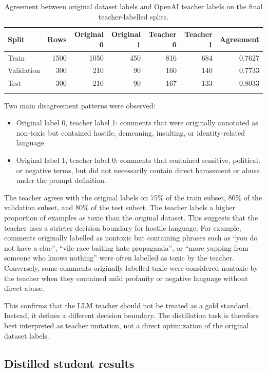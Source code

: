 \documentclass[pdflatex,sn-mathphys-num]{sn-jnl}
\begin{document}
\begin{table}[ht]
\caption{Agreement between original dataset labels and OpenAI teacher labels on the final teacher-labelled splits.}
\label{tab:teacher-agreement}
\begin{tabular}{@{}lrrrrrr@{}}
\toprule
Split & Rows & Original 0 & Original 1 & Teacher 0 & Teacher 1 & Agreement \\
\midrule
Train & 1500 & 1050 & 450 & 816 & 684 & 0.7627 \\
Validation & 300 & 210 & 90 & 160 & 140 & 0.7733 \\
Test & 300 & 210 & 90 & 167 & 133 & 0.8033 \\
\botrule
\end{tabular}
\end{table}

Two main disagreement patterns were observed:
\begin{itemize}
\item Original label 0, teacher label 1: comments that were originally annotated as non-toxic but contained hostile, demeaning, insulting, or identity-related language.
\item Original label 1, teacher label 0: comments that contained sensitive, political, or negative terms, but did not necessarily contain direct harassment or abuse under the prompt definition.
\end{itemize}

The teacher agrees with the original labels on 75\% of the train subset, 80\% of the validation subset, and 80\% of the test subset. 
The teacher labels a higher proportion of examples as toxic than the original dataset.
This suggests that the teacher uses a stricter decision boundary for hostile language.
For example, comments originally labelled as nontoxic but containing phrases such as ``you do not have a clue'', ``vile race baiting hate propaganda'', or ``more yapping from someone who knows nothing'' were often labelled as toxic by the teacher. 
Conversely, some comments originally labelled toxic were considered nontoxic by the teacher when they contained mild profanity or negative language without direct abuse.

This confirms that the LLM teacher should not be treated as a gold standard.
Instead, it defines a different decision boundary. 
The distillation task is therefore best interpreted as teacher imitation, not a direct optimization of the original dataset labels.

\subsection{Distilled student results}
\end{document}
